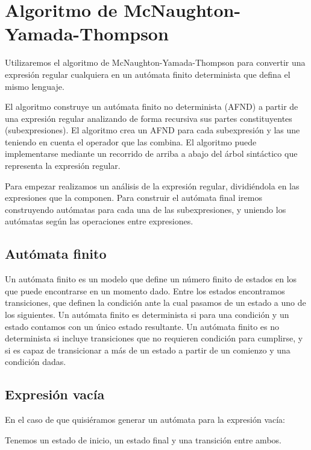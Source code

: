 
\section{Algoritmo de McNaughton-Yamada-Thompson}

Utilizaremos el algoritmo de McNaughton-Yamada-Thompson \cite{5221603, Thompson:1968:PTR:363347.363387} para convertir una expresión regular cualquiera en un autómata finito determinista que defina el mismo lenguaje.

El algoritmo construye un autómata finito no determinista (AFND) a partir de una expresión regular analizando de forma recursiva sus partes constituyentes (subexpresiones).
El algoritmo crea un AFND para cada subexpresión y las une teniendo en cuenta el operador que las combina.
El algoritmo puede implementarse mediante un recorrido de arriba a abajo del árbol sintáctico que representa la expresión regular.

Para empezar realizamos un análisis de la expresión regular, dividiéndola en las expresiones que la componen.
Para construir el autómata final iremos construyendo autómatas para cada una de las subexpresiones, y uniendo los autómatas según las operaciones entre expresiones.

\subsection{Autómata finito}
Un autómata finito es un modelo que define un número finito de estados en los que puede encontrarse en un momento dado.
Entre los estados encontramos transiciones, que definen la condición ante la cual pasamos de un estado a uno de los siguientes.
Un autómata finito es determinista si para una condición y un estado contamos con un único estado resultante.
Un autómata finito es no determinista si incluye transiciones que no requieren condición para cumplirse, y si es capaz de transicionar a más de un estado a partir de un comienzo y una condición dadas.

\subsection{Expresión vacía}
En el caso de que quisiéramos generar un autómata para la expresión vacía:


Tenemos un estado de inicio, un estado final y una transición entre ambos.

